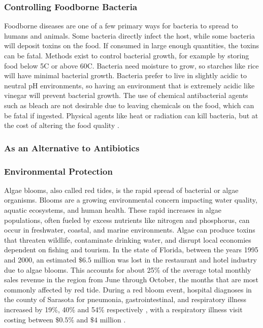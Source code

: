 \subsubsection{Controlling Foodborne Bacteria}
Foodborne diseases are one of a few primary ways for bacteria to spread to humans and animals. Some bacteria directly infect the host, while some bacteria will deposit toxins on the food. If consumed in large enough quantities, the toxins can be fatal. Methods exist to control bacterial growth, for example by storing food below 5C or above 60C. Bacteria need moisture to grow, so starches like rice will have minimal bacterial growth. Bacteria prefer to live in slightly acidic to neutral pH environments, so having an environment that is extremely acidic like vinegar will prevent bacterial growth. The use of chemical antibacterial agents such as bleach are not desirable due to leaving chemicals on the food, which can be fatal if ingested. Physical agents like heat or radiation can kill bacteria, but at the cost of altering the food quality \cite{fieseler_food_2021}. 

\subsubsection{As an Alternative to Antibiotics}


\subsubsection{Environmental Protection}
Algae blooms, also called red tides, is the rapid spread of bacterial or algae organisms. Blooms are a growing environmental concern impacting water quality, aquatic ecosystems, and human health. These rapid increases in algae populations, often fueled by excess nutrients like nitrogen and phosphorus, can occur in freshwater, coastal, and marine environments. Algae can produce toxins that threaten wildlife, contaminate drinking water, and disrupt local economies dependent on fishing and tourism. In the state of Florida, between the years 1995 and 2000, an estimated $\$6.5$ million was lost in the restaurant and hotel industry due to algae blooms. This accounts for about 25\% of the average total monthly sales revenue in the region from June through October, the months that are most commonly affected by red tide\cite{PDFEconomicImpacts}. During a red bloom event, hospital diagnoses in the county of Sarasota for pneumonia, gastrointestinal, and respiratory illness increased by 19\%, 40\% and 54\% respectively \cite{chengCharacterizationMarineAerosol2005, kirkpatrickGastrointestinalEmergencyRoom2010}, with a respiratory illness visit costing between $\$0.5\%$ and $\$4$ million \cite{hoaglandCostsRespiratoryIllnesses2009}. 

